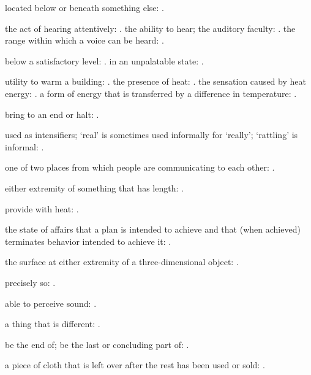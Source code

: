   located below or beneath something else:   .

  the act of hearing attentively:   . the ability to hear; the auditory faculty:   . the range within which a voice can be heard:   .

  below a satisfactory level: . in an unpalatable state:   .

  utility to warm a building:   . the presence of heat:   . the sensation caused by heat energy:   . a form of energy that is transferred by a difference in temperature:   .

  bring to an end or halt:   .

  used as intensifiers; `real' is sometimes used informally for `really'; `rattling' is informal:   .

  one of two places from which people are communicating to each other: .

  either extremity of something that has length:   .

  provide with heat: .

  the state of affairs that a plan is intended to achieve and that (when achieved) terminates behavior intended to achieve it:   .

  the surface at either extremity of a three-dimensional object: .

  precisely so: .

  able to perceive sound: .

  a thing that is different: .

  be the end of; be the last or concluding part of:   .

  a piece of cloth that is left over after the rest has been used or sold:   .

